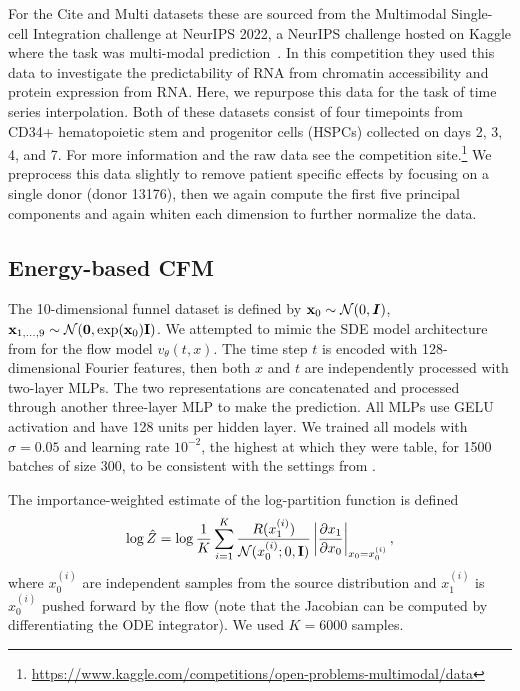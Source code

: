 \documentclass[10pt]{article}
\theoremstyle{plain}
\theoremstyle{definition}
\theoremstyle{remark}
\begin{document}
For the Cite and Multi datasets these are sourced from the Multimodal Single-cell Integration challenge at NeurIPS 2022, a NeurIPS challenge hosted on Kaggle where the task was multi-modal prediction~\citep{burkhardt_multimodal_2022}. In this competition they used this data to investigate the predictability of RNA from chromatin accessibility and protein expression from RNA. Here, we repurpose this data for the task of time series interpolation. Both of these datasets consist of four timepoints from CD34+ hematopoietic stem and progenitor cells (HSPCs) collected on days 2, 3, 4, and 7. For more information and the raw data see the competition site.\footnote{\url{https://www.kaggle.com/competitions/open-problems-multimodal/data}} We preprocess this data slightly to remove patient specific effects by focusing on a single donor (donor 13176), then we again compute the first five principal components and again whiten each dimension to further normalize the data. 

\subsection{Energy-based CFM}
\label{app:details_ebm}

The 10-dimensional funnel dataset is defined by $\mathbf{x}_0\sim{\mathcal{N}}(0,{\bm{I}})$, $\mathbf{x}_{1,\ldots,9}\sim{\mathcal{N}}(\boldsymbol{0},\exp(\mathbf{x}_0){\rm \mathbf{I}})$. 
We attempted to mimic the SDE model architecture from \citet{zhang2022path} for the flow model $v_\theta(t,x)$. The time step $t$ is encoded with 128-dimensional Fourier features, then both $x$ and $t$ are independently processed with two-layer MLPs. The two representations are concatenated and processed through another three-layer MLP to make the prediction. All MLPs use GELU activation and have 128 units per hidden layer. We trained all models with $\sigma=0.05$ and learning rate $10^{-2}$, the highest at which they were table, for 1500 batches of size 300, to be consistent with the settings from \citet{zhang2022path}.

The importance-weighted estimate of the log-partition function is defined
\[\log\hat Z=\log\frac1K\sum_{i=1}^K\frac{R(x_1^{(i)})}{{\mathcal{N}}(x_0^{(i)};0,\mathbf{I})}\left|\frac{\partial x_1}{\partial x_0}\right|_{x_0=x_0^{(i)}},\]
where $x_0^{(i)}$ are independent samples from the source distribution and $x_1^{(i)}$ is $x_0^{(i)}$ pushed forward by the flow (note that the Jacobian can be computed by differentiating the ODE integrator). We used $K=6000$ samples.
\end{document}
